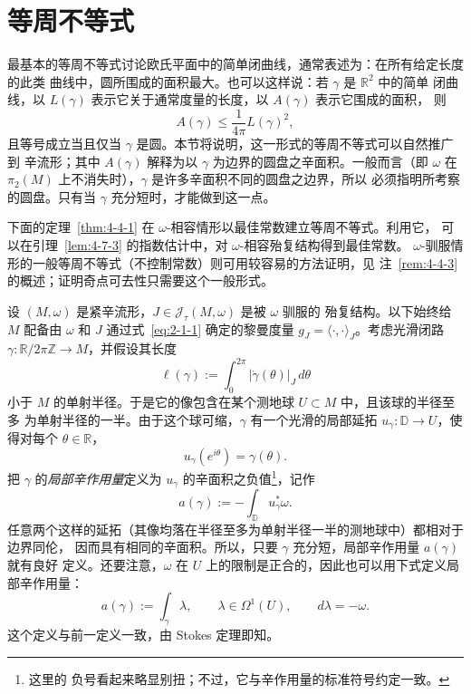 
\section{等周不等式}\label{sec:4-4}

最基本的等周不等式讨论欧氏平面中的简单闭曲线，通常表述为：在所有给定长度的此类
曲线中，圆所围成的面积最大。也可以这样说：若 $\gamma$ 是 $\mathbb R^2$ 中的简单
闭曲线，以 $L(\gamma)$ 表示它关于通常度量的长度，以 $A(\gamma)$ 表示它围成的面积，
则
\[
  A(\gamma)\le\frac1{4\pi}L(\gamma)^2,
\]
且等号成立当且仅当 $\gamma$ 是圆。本节将说明，这一形式的等周不等式可以自然推广到
辛流形；其中 $A(\gamma)$ 解释为以 $\gamma$ 为边界的圆盘之辛面积。一般而言（即
$\omega$ 在 $\pi_2(M)$ 上不消失时），$\gamma$ 是许多辛面积不同的圆盘之边界，所以
必须指明所考察的圆盘。只有当 $\gamma$ 充分短时，才能做到这一点。

下面的定理~\ref{thm:4-4-1} 在 $\omega$-相容情形以最佳常数建立等周不等式。利用它，
可以在引理~\ref{lem:4-7-3} 的指数估计中，对 $\omega$-相容殆复结构得到最佳常数。
$\omega$-驯服情形的一般等周不等式（不控制常数）则可用较容易的方法证明，见
注~\ref{rem:4-4-3} 的概述；证明奇点可去性只需要这个一般形式。

设 $(M,\omega)$ 是紧辛流形，$J\in\mathcal J_\tau(M,\omega)$ 是被 $\omega$ 驯服的
殆复结构。以下始终给 $M$ 配备由 $\omega$ 和 $J$ 通过式~\eqref{eq:2-1-1} 确定的黎曼度量
$g_J=\langle\cdot,\cdot\rangle_J$。考虑光滑闭路
$\gamma:\mathbb R/2\pi\mathbb Z\to M$，并假设其长度
\[
  \ell(\gamma):=\int_0^{2\pi}|\dot\gamma(\theta)|_J\,d\theta
\]
小于 $M$ 的单射半径。于是它的像包含在某个测地球 $U\subset M$ 中，且该球的半径至多
为单射半径的一半。由于这个球可缩，$\gamma$ 有一个光滑的局部延拓
$u_\gamma:\mathbb D\to U$，使得对每个 $\theta\in\mathbb R$，
\[
  u_\gamma(e^{i\theta})=\gamma(\theta).
\]
把 $\gamma$ 的\emph{局部辛作用量}定义为 $u_\gamma$ 的辛面积之负值\footnote{这里的
负号看起来略显别扭；不过，它与辛作用量的标准符号约定一致。}，记作
\[
  a(\gamma):=-\int_{\mathbb D}u_\gamma^*\omega.
\]
任意两个这样的延拓（其像均落在半径至多为单射半径一半的测地球中）都相对于边界同伦，
因而具有相同的辛面积。所以，只要 $\gamma$ 充分短，局部辛作用量 $a(\gamma)$ 就有良好
定义。还要注意，$\omega$ 在 $U$ 上的限制是正合的，因此也可以用下式定义局部辛作用量：
\begin{equation}\label{eq:4-4-1}
  a(\gamma):=\int_\gamma\lambda,
  \qquad
  \lambda\in\Omega^1(U),
  \qquad d\lambda=-\omega.
\end{equation}
这个定义与前一定义一致，由 Stokes 定理即知。

